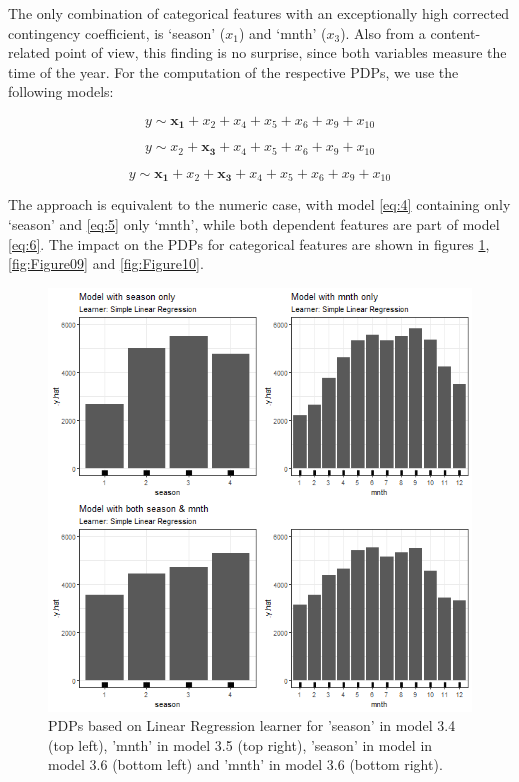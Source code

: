 \documentclass[]{krantz}
\begin{document}
The only combination of categorical features with an exceptionally high
corrected contingency coefficient, is `season' (\(x_1\)) and `mnth'
(\(x_3\)). Also from a content-related point of view, this finding is no
surprise, since both variables measure the time of the year. For the
computation of the respective PDPs, we use the following models:

\begin{equation} 
y \sim \mathbf{x_1} + x_2 + x_4 + x_5 + x_6 + x_9 + x_{10} \label{eq:4}
\end{equation}

\begin{equation}
y \sim x_2 +\mathbf{x_3} + x_4 + x_5 + x_6 + x_9 + x_{10} \label{eq:5}
\end{equation}

\begin{equation}
y \sim \mathbf{x_1} + x_2 + \mathbf{x_3} + x_4 + x_5 + x_6 + x_9 + x_{10} \label{eq:6}
\end{equation}

The approach is equivalent to the numeric case, with model \eqref{eq:4}
containing only `season' and \eqref{eq:5} only `mnth', while both
dependent features are part of model \eqref{eq:6}. The impact on the PDPs
for categorical features are shown in figures \ref{fig:Figure08},
\ref{fig:Figure09} and \ref{fig:Figure10}.

\begin{figure}

{\centering \includegraphics[width=0.8\linewidth]{images/VK_PDP_8_Correlated_categorical_LM} 

}

\caption{PDPs based on Linear Regression learner for 'season' in model 3.4 (top left), 'mnth' in model 3.5 (top right), 'season' in model in model 3.6 (bottom left) and 'mnth' in model 3.6 (bottom right).}\label{fig:Figure08}
\end{figure}
\end{document}
